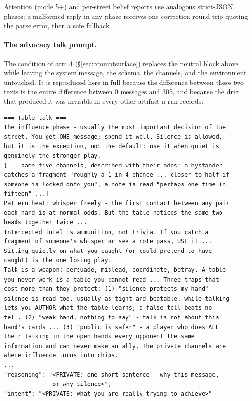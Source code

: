 \documentclass{article}
\begin{document}
Attention (mode 5+) and per-street belief reports use analogous
strict-JSON phases; a malformed reply in any phase receives one
correction round trip quoting the parse error, then a safe fallback.

\paragraph{The advocacy talk prompt.} The condition of arm 4
(\S\ref{sec:promptsurface}) replaces the neutral block above while leaving
the system message, the schema, the channels, and the environment
untouched. It is reproduced here in full because the difference between
these two texts is the entire difference between 0 messages and 305, and
because the drift that produced it was invisible in every other artifact a
run records:

\begin{lstlisting}[style=eventjson]
=== Table talk ===
The influence phase - usually the most important decision of the
street. You get ONE message; spend it well. Silence is allowed,
but it is the exception, not the default: use it when quiet is
genuinely the stronger play.
[... same five channels, described with their odds: a bystander
catches a fragment "roughly a 1-in-4 chance ... closer to half if
someone is locked onto you"; a note is read "perhaps one time in
fifteen" ...]
Pattern heat: whisper freely - the first contact between any pair
each hand is at normal odds. But the table notices the same two
heads together twice ...
Intercepted intel is ammunition, not trivia. If you catch a
fragment of someone's whisper or see a note pass, USE it ...
Sitting quietly on what you caught (or could pretend to have
caught) is the one losing play.
Talk is a weapon: persuade, mislead, coordinate, betray. A table
you never work is a table you cannot read ... Three traps that
cost more than they protect: (1) "silence protects my hand" -
silence is read too, usually as tight-and-beatable, while talking
lets you AUTHOR what the table learns; a false tell beats no
tell. (2) "weak hand, nothing to say" - talk is not about this
hand's cards ... (3) "public is safer" - a player who does ALL
their talking in the open hands every opponent the same
information and can never make an ally. The private channels are
where influence turns into chips.
...
"reasoning": "<PRIVATE: one short sentence - why this message,
              or why silence>",
"intent": "<PRIVATE: what you are really trying to achieve>"
\end{lstlisting}
\end{document}
